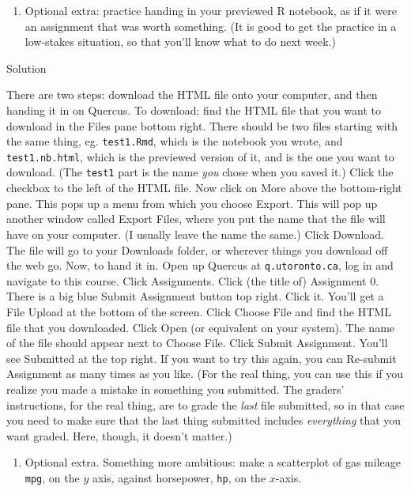 \documentclass[]{tufte-book}
\providecommand{\tightlist}{%
  \setlength{\itemsep}{0pt}\setlength{\parskip}{0pt}}
\theoremstyle{definition}
\theoremstyle{definition}
\theoremstyle{definition}
\theoremstyle{remark}
\begin{document}
\begin{enumerate}
\def\labelenumi{(\alph{enumi})}
\setcounter{enumi}{9}
\tightlist
\item
  Optional extra: practice handing in your previewed R notebook, as if
  it were an assignment that was worth something. (It is good to get the
  practice in a low-stakes situation, so that you'll know what to do
  next week.)
\end{enumerate}

Solution

There are two steps: download the HTML file onto your computer, and then
handing it in on Quercus. To download: find the HTML file that you want
to download in the Files pane bottom right. There should be two files
starting with the same thing, eg. \texttt{test1.Rmd}, which is the
notebook you wrote, and \texttt{test1.nb.html}, which is the previewed
version of it, and is the one you want to download. (The \texttt{test1}
part is the name \emph{you} chose when you saved it.) Click the checkbox
to the left of the HTML file. Now click on More above the bottom-right
pane. This pops up a menu from which you choose Export. This will pop up
another window called Export Files, where you put the name that the file
will have on your computer. (I usually leave the name the same.) Click
Download. The file will go to your Downloads folder, or wherever things
you download off the web go. Now, to hand it in. Open up Quercus at
\texttt{q.utoronto.ca}, log in and navigate to this course. Click
Assignments. Click (the title of) Assignment 0. There is a big blue
Submit Assignment button top right. Click it. You'll get a File Upload
at the bottom of the screen. Click Choose File and find the HTML file
that you downloaded. Click Open (or equivalent on your system). The name
of the file should appear next to Choose File. Click Submit Assignment.
You'll see Submitted at the top right. If you want to try this again,
you can Re-submit Assignment as many times as you like. (For the real
thing, you can use this if you realize you made a mistake in something
you submitted. The graders' instructions, for the real thing, are to
grade the \emph{last} file submitted, so in that case you need to make
sure that the last thing submitted includes \emph{everything} that you
want graded. Here, though, it doesn't matter.)

\begin{enumerate}
\def\labelenumi{(\alph{enumi})}
\setcounter{enumi}{10}
\tightlist
\item
  Optional extra. Something more ambitious: make a scatterplot of gas
  mileage \texttt{mpg}, on the \(y\) axis, against horsepower,
  \texttt{hp}, on the \(x\)-axis.
\end{enumerate}
\end{document}
